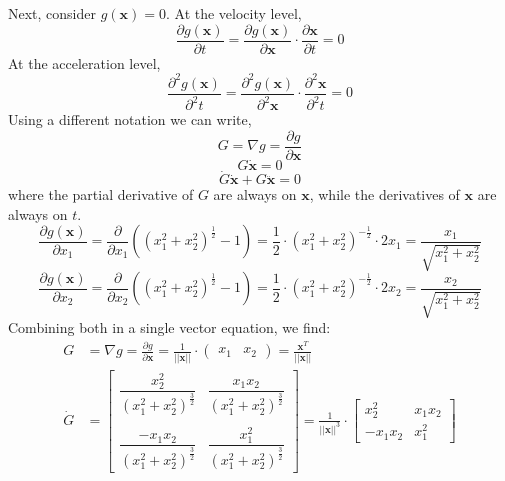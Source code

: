 \documentclass{article}
\begin{document}
Next, consider $g(\mathbf{x}) = 0$. At the velocity level,
\[
\frac{\partial{g(\mathbf{x})}}{\partial{t}}  = \frac{\partial{g(\mathbf{x})}}{\partial{\mathbf{x}}} \cdot \frac{\partial{\mathbf{x}}}{\partial{t}} = 0
\]
At the acceleration level,
\[
\frac{\partial^2{g(\mathbf{x})}}{\partial^2 t}  = \frac{\partial^2{g(\mathbf{x})}}{\partial^2{\mathbf{x}}} \cdot \frac{\partial^2{\mathbf{x}}}{\partial^2{t}} = 0
\]
Using a different notation we can write,
\begin{equation}
G = \nabla g = \frac{\partial{g}}{\partial{\mathbf{x}}}
\end{equation}
\begin{equation}
G \dot{\mathbf{x}} = 0
\end{equation}
\begin{equation}
\dot{G} \dot{\mathbf{x}} + G \ddot{\mathbf{x}} = 0
\end{equation}
where the partial derivative of $G$ are always on $\mathbf{x}$, while the derivatives of $\mathbf{x}$ are always on $t$.
\[    \frac{\partial g(\mathbf{x})}{\partial x_1} = \frac{\partial}{\partial x_1}((x_1^2+x_2^2)^{\frac{1}{2}} - 1)  = \frac{1}{2} \cdot (x_1^2 + x_2^2)^{-\frac{1}{2}} \cdot 2 x_1 = \frac{x_1}{\sqrt{x_1^2 + x_2^2}}
\]
\[
    \frac{\partial g(\mathbf{x})}{\partial x_2} = \frac{\partial}{\partial x_2}((x_1^2+x_2^2)^{\frac{1}{2}} - 1)  = \frac{1}{2} \cdot (x_1^2 + x_2^2)^{-\frac{1}{2}} \cdot 2 x_2 = \frac{x_2}{\sqrt{x_1^2 + x_2^2}}
\]
Combining both in a single vector equation, we find:
\begin{align*}
    G &= \nabla g = \frac{\partial{g}}{\partial{\mathbf{x}}} = 
    \frac{1}{||\mathbf{x}||} \cdot
    \begin{pmatrix}
        x_1 & x_2
    \end{pmatrix} =
    \frac{\mathbf{x}^T}{||\mathbf{x}||}\\
    \dot{G} &=
    \begin{bmatrix}
        \dfrac{x_2^2}{(x_1^2 + x_2^2)^{\frac{3}{2}}} & \dfrac{x_1 x_2}{(x_1^2 + x_2^2)^{\frac{3}{2}}} \\ \\
        \dfrac{-x_1 x_2}{(x_1^2 + x_2^2)^{\frac{3}{2}}} & \dfrac{x_1^2}{(x_1^2 + x_2^2)^{\frac{3}{2}}}
    \end{bmatrix} = 
    \frac{1}{||\mathbf{x}||^3} \cdot
    \begin{bmatrix}
        x_2^2 & x_1 x_2 \\
        -x_1 x_2 & x_1^2
    \end{bmatrix}
\end{align*}
\end{document}
